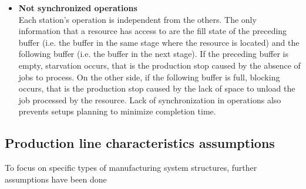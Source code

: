 \begin{itemize}
\item \textbf{Not synchronized operations}\\
Each station's operation is independent from the others. The only information that a resource has access to are the fill state of the preceding buffer (i.e. the buffer in the same stage where the resource is located) and the following buffer (i.e. the buffer in the next stage). If the preceding buffer is empty, starvation occurs, that is the production stop caused by the absence of jobs to process. On the other side, if the following buffer is full, blocking occurs, that is the production stop caused by the lack of space to unload the job processed by the resource. Lack of synchronization in operations also prevents setups planning to minimize completion time. 
\end{itemize}
\subsection{Production line characteristics assumptions}
To focus on specific types of manufacturing system structures, further assumptions have been done
